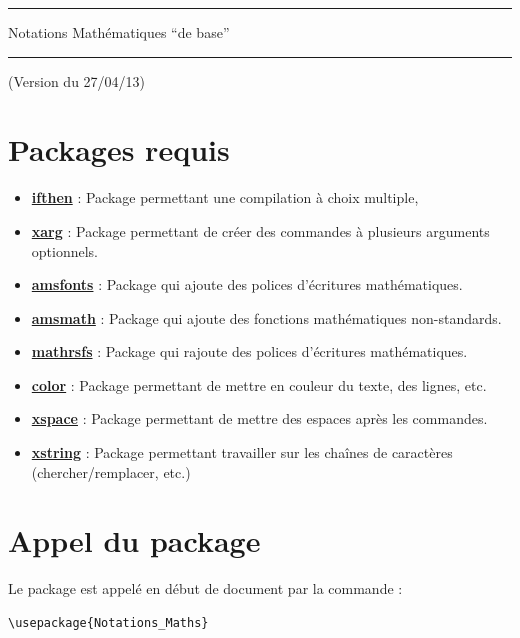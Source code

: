 \documentclass[a4paper,10pt]{article}
\begin{document}
	\begin{center}
		\hrule{\Large Notations Mathématiques ``de base''}\\\hrule
	\end{center}

	(Version du 27/04/13)

	\section{Packages requis}

	\begin{itemize}
		\item \href{http://www.ctan.org/pkg/ifthen}{\textbf{ifthen}} : Package permettant une compilation à choix multiple,
		\item \href{http://tug.ctan.org/tex-archive/macros/latex/contrib/xargs}{\textbf{xarg}} : Package permettant de créer des commandes à plusieurs arguments optionnels.
		\item \href{http://www.ams.org/publications/authors/tex/amsfonts}{\textbf{amsfonts}} : Package qui ajoute des polices d'écritures mathématiques.
		\item \href{http://www.ams.org/publications/authors/tex/amslatex}{\textbf{amsmath}} : Package qui ajoute des fonctions mathématiques non-standards.
		\item \href{http://www.ctan.org/pkg/mathrsfs}{\textbf{mathrsfs}} : Package qui rajoute des polices d'écritures mathématiques.
		\item \href{http://www.ctan.org/pkg/color}{\textbf{color}} : Package permettant de mettre en couleur du texte, des lignes, etc.
		\item \href{http://www.ctan.org/pkg/xspace}{\textbf{xspace}} : Package permettant de mettre des espaces après les commandes.
		\item \href{http://www.ctan.org/pkg/xstring}{\textbf{xstring}} : Package permettant travailler sur les chaînes de caractères (chercher/remplacer, etc.)
	\end{itemize}

	\section{Appel du package}

	Le package est appelé en début de document par la commande :
	\begin{verbatim}
\usepackage{Notations_Maths}
	\end{verbatim}
\end{document}
